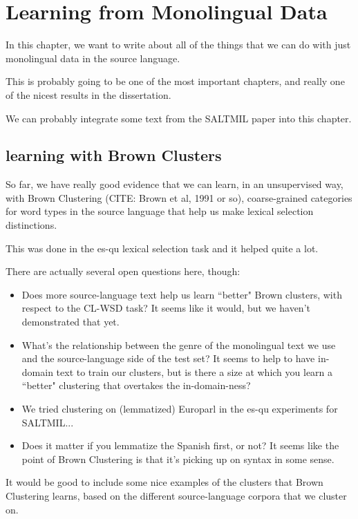 \chapter{Learning from Monolingual Data}
In this chapter, we want to write about all of the things that we can do with
just monolingual data in the source language.

This is probably going to be one of the most important chapters, and really one
of the nicest results in the dissertation.

We can probably integrate some text from the SALTMIL paper into this chapter.

\section{learning with Brown Clusters}
So far, we have really good evidence that we can learn, in an unsupervised way,
with Brown Clustering (CITE: Brown et al, 1991 or so),
coarse-grained categories for word types in the source language that help us
make lexical selection distinctions.

This was done in the es-qu lexical selection task and it helped quite a lot.

There are actually several open questions here, though:

\begin{itemize}
  \item Does more source-language text help us learn ``better" Brown clusters,
    with respect to the CL-WSD task? It seems like it would, but we haven't
    demonstrated that yet.
  \item What's the relationship between the genre of the monolingual text we
    use and the source-language side of the test set? It seems to help to have
    in-domain text to train our clusters, but is there a size at which you
    learn a ``better" clustering that overtakes the in-domain-ness?
  \item We tried clustering on (lemmatized) Europarl in the es-qu experiments for SALTMIL...
  \item Does it matter if you lemmatize the Spanish first, or not? It seems
    like the point of Brown Clustering is that it's picking up on syntax in
    some sense.
\end{itemize}

It would be good to include some nice examples of the clusters that Brown
Clustering learns, based on the different source-language corpora that we
cluster on.

